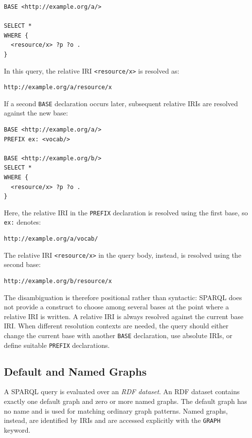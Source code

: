 \documentclass{scrbook}
\begin{document}
	\begin{lstlisting}
BASE <http://example.org/a/>

SELECT *
WHERE {
  <resource/x> ?p ?o .
}
	\end{lstlisting}
	
	In this query, the relative IRI \texttt{<resource/x>} is resolved as:
	
	\begin{lstlisting}
http://example.org/a/resource/x
	\end{lstlisting}
	
	If a second \texttt{BASE} declaration occurs later, subsequent relative IRIs are resolved against the new base:
	
	\begin{lstlisting}
BASE <http://example.org/a/>
PREFIX ex: <vocab/>

BASE <http://example.org/b/>
SELECT *
WHERE {
  <resource/x> ?p ?o .
}
	\end{lstlisting}
	
	Here, the relative IRI in the \texttt{PREFIX} declaration is resolved using the first base, so \texttt{ex:} denotes:
	
	\begin{lstlisting}
http://example.org/a/vocab/
	\end{lstlisting}
	
	The relative IRI \texttt{<resource/x>} in the query body, instead, is resolved using the second base:
	
	\begin{lstlisting}
http://example.org/b/resource/x
	\end{lstlisting}
	
	The disambiguation is therefore positional rather than syntactic: SPARQL does not provide a construct to choose among several bases at the point where a relative IRI is written. A relative IRI is always resolved against the current base IRI. When different resolution contexts are needed, the query should either change the current base with another \texttt{BASE} declaration, use absolute IRIs, or define suitable \texttt{PREFIX} declarations.
	
	\subsection{Default and Named Graphs}
	
	A SPARQL query is evaluated over an \emph{RDF dataset}. An RDF dataset contains exactly one default graph and zero or more named graphs. The default graph has no name and is used for matching ordinary graph patterns. Named graphs, instead, are identified by IRIs and are accessed explicitly with the \texttt{GRAPH} keyword.\\
	
\end{document}

